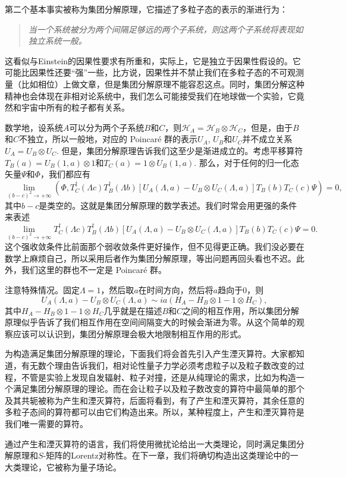 \documentclass[11pt]{article}
\theoremstyle{definition}
\theoremstyle{plain}
\begin{document}
第二个基本事实被称为集团分解原理，它描述了多粒子态的表示的渐进行为：
\begin{quote}\it
	当一个系统被分为两个间隔足够远的两个子系统，则这两个子系统将表现如独立系统一般。
\end{quote}
这看似与Einstein的因果性要求有所重和，实际上，它是独立于因果性假设的。它可能比因果性还要“强”一些，比方说，因果性并不禁止我们在多粒子态的不可观测量（比如相位）上做文章，但是集团分解原理不能容忍这点。同时，集团分解这种精神也会体现在非相对论系统中，我们怎么可能接受我们在地球做一个实验，它竟然和宇宙中所有的粒子都有关系。

数学地，设系统$A$可以分为两个子系统$B$和$C$，则$\mathcal{H}_A=\mathcal{H}_B\otimes \mathcal{H}_C$，但是，由于$B$和$C$不独立，所以一般地，对应的 Poincar\'{e} 群的表示$U_A$, $U_B$和$U_C$并不成立关系$U_A=U_B\otimes U_C$. 但是，集团分解原理告诉我们这至少是渐进成立的。考虑平移算符$T_B(a)=U_B(1,a)\otimes 1$和$T_C(a)=1 \otimes U_B(1,a)$. 那么，对于任何的归一化态矢量$\Psi$和$\Phi$，我们都应有
\[
	\lim_{(b-c)^2\to +\infty} \left(\Phi,T_C^\dag(\Lambda c) T_B^\dag(\Lambda b) \left[U_A(\Lambda,a)-U_B\otimes U_C(\Lambda,a)\right]T_B(b)T_C(c)\Psi\right)=0,
\]
其中$b-c$是类空的。这就是集团分解原理的数学表述。我们时常会用更强的条件来表述
\[
	\lim_{(b-c)^2\to +\infty}T_C^\dag(\Lambda c) T_B^\dag(\Lambda b) \left[U_A(\Lambda,a)-U_B\otimes U_C(\Lambda,a)\right]T_B(b)T_C(c)\Psi=0.
\]
这个强收敛条件比前面那个弱收敛条件更好操作，但不见得更正确。我们没必要在数学上麻烦自己，所以采用后者作为集团分解原理，等出问题再回头看也不迟。此外，我们这里的群也不一定是 Poincar\'{e} 群。

注意特殊情况。固定$\Lambda=1$，然后取$a$在时间方向，然后将$a$趋向于$0$，则
\[
	U_A(\Lambda,a)-U_B\otimes U_C(\Lambda,a)\sim ia (H_A-H_B\otimes 1-1\otimes H_C),
\]
其中$H_A-H_B\otimes 1-1\otimes H_C$几乎就是在描述$B$和$C$之间的相互作用，所以集团分解原理似乎告诉了我们相互作用在空间间隔变大的时候会渐进为零。从这个简单的观察应该可以认识到，集团分解原理会极大地限制相互作用的形式。

为构造满足集团分解原理的理论，下面我们将会首先引入产生湮灭算符。大家都知道，有无数个理由告诉我们，相对论性量子力学必须考虑粒子以及粒子数改变的过程，不管是实验上发现自发辐射、粒子对撞，还是从纯理论的需求，比如为构造一个满足集团分解原理的理论。而在会让粒子以及粒子数改变的算符中最简单的那个及其共轭被称为产生和湮灭算符，后面将看到，有了产生和湮灭算符，其余任意的多粒子态间的算符都可以由它们构造出来。所以，某种程度上，产生和湮灭算符是我们唯一需要的算符。

通过产生和湮灭算符的语言，我们将使用微扰论给出一大类理论，同时满足集团分解原理和$S$-矩阵的Lorentz对称性。在下一章，我们将确切构造出这类理论中的一大类理论，它被称为量子场论。
\end{document}
